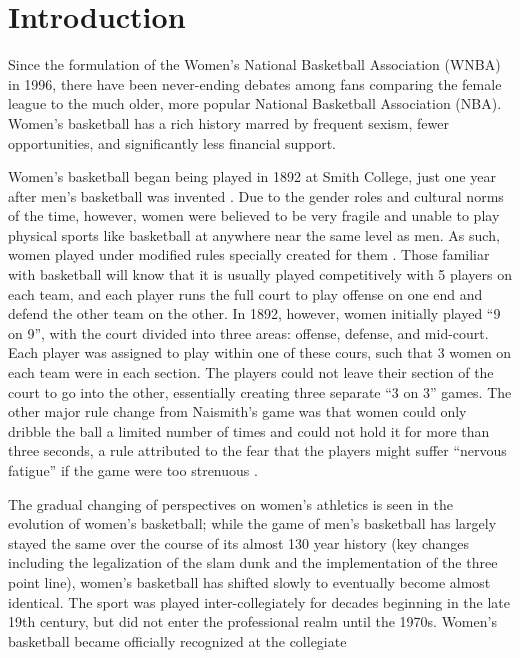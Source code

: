 \documentclass[12pt, titlepage]{article}
\begin{document}
\section{Introduction}
\hspace*{10mm}
Since the formulation of the Women’s National Basketball Association (WNBA) in 1996, there have been never-ending debates among fans comparing the female 
league to the much older, more popular National Basketball Association (NBA). Women’s basketball has a rich history marred by frequent sexism, fewer 
opportunities, and significantly less financial support.
\par
Women’s basketball began being played in 1892 at Smith College, just one year after men’s basketball was invented \citep{Shattering_The_Glass}. Due to the 
gender roles and cultural norms of the time, however, women were believed to be very fragile and unable to play physical sports like 
basketball at anywhere near the same level as men. As such, women played under modified rules specially created for them \citep{WNBA_Hist}. Those familiar 
with basketball will know that it is usually played competitively with 5 players on each team, and each player runs the full court to play offense on one 
end and defend the other team on the other. In 1892, however, women initially played “9 on 9”, with the court divided into three areas: offense, 
defense, and mid-court. Each player was assigned to play within one of these cours, such that 3 women on each team were in each section. The 
players could not leave their section of the court to go into the other, essentially creating three separate “3 on 3” games. The other major rule change 
from Naismith's game was that women could only dribble the ball a limited number of times and could not hold it for more than three seconds, a rule 
attributed to the fear that the players might suffer “nervous fatigue” if the game were too strenuous \citep{WNBA_Hist}.
\par
The gradual changing of perspectives on women’s athletics is seen in the evolution of women’s basketball; while the game of men’s basketball has largely 
stayed the same over the course of its almost 130 year history (key changes including the legalization of the slam dunk and the implementation of the 
three point line), women’s basketball has shifted slowly to eventually become almost identical. The sport was played inter-collegiately for decades 
beginning in the late 19th century, but did not enter the professional realm until the 1970s. Women's basketball became officially recognized at the collegiate 
\end{document}
